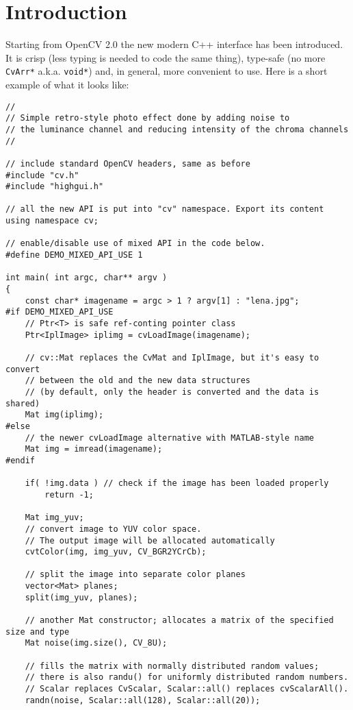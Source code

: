 \ifCpp
\chapter{Introduction}

Starting from OpenCV 2.0 the new modern C++ interface has been introduced.
It is crisp (less typing is needed to code the same thing), type-safe (no more \texttt{CvArr*} a.k.a. \texttt{void*})
and, in general, more convenient to use. Here is a short example of what it looks like:

\begin{lstlisting}
//
// Simple retro-style photo effect done by adding noise to
// the luminance channel and reducing intensity of the chroma channels
//

// include standard OpenCV headers, same as before
#include "cv.h"
#include "highgui.h"

// all the new API is put into "cv" namespace. Export its content
using namespace cv;

// enable/disable use of mixed API in the code below.
#define DEMO_MIXED_API_USE 1

int main( int argc, char** argv )
{
    const char* imagename = argc > 1 ? argv[1] : "lena.jpg";
#if DEMO_MIXED_API_USE
    // Ptr<T> is safe ref-conting pointer class
    Ptr<IplImage> iplimg = cvLoadImage(imagename);
    
    // cv::Mat replaces the CvMat and IplImage, but it's easy to convert
    // between the old and the new data structures
    // (by default, only the header is converted and the data is shared)
    Mat img(iplimg); 
#else
    // the newer cvLoadImage alternative with MATLAB-style name
    Mat img = imread(imagename);
#endif

    if( !img.data ) // check if the image has been loaded properly
        return -1;

    Mat img_yuv;
    // convert image to YUV color space.
    // The output image will be allocated automatically
    cvtColor(img, img_yuv, CV_BGR2YCrCb); 

    // split the image into separate color planes
    vector<Mat> planes;
    split(img_yuv, planes);

    // another Mat constructor; allocates a matrix of the specified size and type
    Mat noise(img.size(), CV_8U);
    
    // fills the matrix with normally distributed random values;
    // there is also randu() for uniformly distributed random numbers. 
    // Scalar replaces CvScalar, Scalar::all() replaces cvScalarAll().
    randn(noise, Scalar::all(128), Scalar::all(20));
                                                     

\end{lstlisting}

